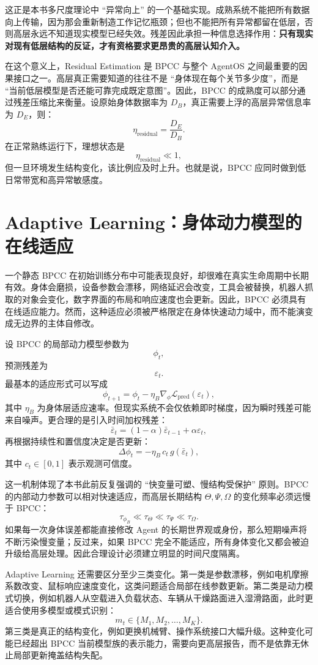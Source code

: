 这正是本书多尺度理论中 ``异常向上'' 的一个基础实现。成熟系统不能把所有数据向上传输，因为那会重新制造工作记忆瓶颈；但也不能把所有异常都留在低层，否则高层永远不知道现实模型已经失效。残差因此承担一种信息选择作用：\textbf{只有现实对现有低层结构的反证，才有资格要求更昂贵的高层认知介入。}

在这个意义上，Residual Estimation 是 BPCC 与整个 AgentOS 之间最重要的因果接口之一。高层真正需要知道的往往不是 ``身体现在每个关节多少度''，而是 ``当前低层模型是否还能可靠完成既定意图''。因此，BPCC 的成熟度可以部分通过残差压缩比来衡量。设原始身体数据率为 $D_B$，真正需要上浮的高层异常信息率为 $D_E$，则：
\[
\eta_{\mathrm{residual}}
=
\frac{D_E}{D_B}.
\]
在正常熟练运行下，理想状态是
\[
\eta_{\mathrm{residual}}\ll1,
\]
但一旦环境发生结构变化，该比例应及时上升。也就是说，BPCC 应同时做到低日常带宽和高异常敏感度。

\section{Adaptive Learning：身体动力模型的在线适应}

一个静态 BPCC 在初始训练分布中可能表现良好，却很难在真实生命周期中长期有效。身体会磨损，设备参数会漂移，网络延迟会改变，工具会被替换，机器人抓取的对象会变化，数字界面的布局和响应速度也会更新。因此，BPCC 必须具有在线适应能力。然而，这种适应必须被严格限定在身体快速动力域中，而不能演变成无边界的主体自修改。

设 BPCC 的局部动力模型参数为
\[
\phi_t,
\]
预测残差为
\[
\varepsilon_t.
\]
最基本的适应形式可以写成
\[
\phi_{t+1}
=
\phi_t
-
\eta_B
\nabla_\phi
\mathcal L_{\mathrm{pred}}
(\varepsilon_t),
\]
其中 $\eta_B$ 为身体层适应速率。但现实系统不会仅依赖即时梯度，因为瞬时残差可能来自噪声。更合理的是引入时间加权残差：
\[
\bar\varepsilon_t
=
(1-\alpha)\bar\varepsilon_{t-1}
+
\alpha\varepsilon_t,
\]
再根据持续性和置信度决定是否更新：
\[
\Delta\phi_t
=
-\eta_B
\,c_t
\,g(\bar\varepsilon_t),
\]
其中 $c_t\in[0,1]$ 表示观测可信度。

这一机制体现了本书此前反复强调的 ``快变量可塑、慢结构受保护'' 原则。BPCC 的内部动力参数可以相对快速适应，而高层长期结构 $\Theta,\Psi,\Omega$ 的变化频率必须远慢于 BPCC：
\[
\tau_{\phi_B}
\ll
\tau_\Theta
\ll
\tau_\Psi
\ll
\tau_\Omega.
\]
如果每一次身体误差都能直接修改 Agent 的长期世界观或身份，那么短期噪声将不断污染慢变量；反过来，如果 BPCC 完全不能适应，所有身体变化又都会被迫升级给高层处理。因此合理设计必须建立明显的时间尺度隔离。

Adaptive Learning 还需要区分至少三类变化。第一类是参数漂移，例如电机摩擦系数改变、鼠标响应速度变化，这类问题适合局部在线参数更新。第二类是动力模式切换，例如机器人从空载进入负载状态、车辆从干燥路面进入湿滑路面，此时更适合使用多模型或模式识别：
\[
m_t
\in
\{M_1,M_2,\ldots,M_K\}.
\]
第三类是真正的结构变化，例如更换机械臂、操作系统接口大幅升级。这种变化可能已经超出 BPCC 当前模型族的表示能力，需要向更高层报告，而不是依靠无休止局部更新掩盖结构失配。

